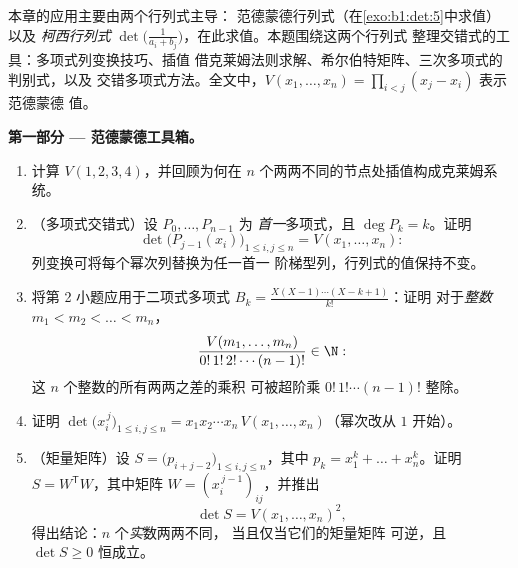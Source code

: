 \begin{problem}\label{pb:b1:det:1}
本章的应用主要由两个行列式主导：
范德蒙德行列式（在\cref{exo:b1:det:5}中求值）以及
\emph{柯西行列式} $\det\bigl(\frac{1}{a_i +
b_j}\bigr)$，在此求值。本题围绕这两个行列式
整理交错式的工具：多项式列变换技巧、插值
借克莱姆法则求解、希尔伯特矩阵、三次多项式的判别式，以及
交错多项式方法。全文中，$V(x_1,
\dots, x_n) = \prod_{i < j}(x_j - x_i)$ 表示范德蒙德
值。

\medskip
\noindent\textbf{第一部分 --- 范德蒙德工具箱。}
\begin{enumerate}
  \item 计算 $V(1, 2, 3, 4)$，并回顾为何在
        $n$ 个两两不同的节点处插值构成克莱姆系统。
  \item （多项式交错式）设 $P_0, \dots, P_{n-1}$ 为
        \emph{首一}多项式，且 $\deg P_k = k$。证明
        \[
        \det\bigl(P_{j-1}(x_i)\bigr)_{1 \leq i, j \leq n}
        = V(x_1, \dots, x_n) :
        \]
        列变换可将每个幂次列替换为任一首一
        阶梯型列，行列式的值保持不变。
  \item 将第 2 小题应用于二项式多项式 $B_k =
        \frac{X(X-1)\cdots(X-k+1)}{k!}$：证明
        对于\emph{整数} $m_1 < m_2 < \dots < m_n$，
        \[
        \frac{V(m_1, \dots, m_n)}{0!\,1!\,2!\cdots(n-1)!}
        \in \N :
        \]
        这 $n$ 个整数的所有两两之差的乘积
        可被超阶乘 $0!\,1!\cdots(n-1)!$ 整除。
  \item 证明 $\det\bigl(x_i^{\,j}\bigr)_{1 \leq i, j \leq n} =
        x_1 x_2 \cdots x_n\, V(x_1, \dots, x_n)$（幂次改从
        $1$ 开始）。
  \item （矩量矩阵）设 $S = \bigl(p_{i+j-2}\bigr)_{1 \leq
        i, j \leq n}$，其中 $p_k = x_1^k + \dots + x_n^k$。证明
        $S = W^{\mathsf T} W$，其中矩阵 $W =
        (x_i^{\,j-1})_{ij}$，并推出
        \[
        \det S = V(x_1, \dots, x_n)^2 ,
        \]
        得出结论：$n$ 个\emph{实}数两两不同，
        当且仅当它们的矩量矩阵
        可逆，且 $\det S \geq 0$ 恒成立。
\end{enumerate}


\end{problem}
